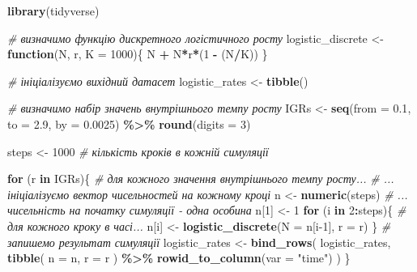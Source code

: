 \documentclass[
  11pt,
]{book}
\newenvironment{Shaded}{\begin{snugshade}}{\end{snugshade}}
\newcommand{\AttributeTok}[1]{\textcolor[rgb]{0.13,0.29,0.53}{#1}}
\newcommand{\CommentTok}[1]{\textcolor[rgb]{0.56,0.35,0.01}{\textit{#1}}}
\newcommand{\ControlFlowTok}[1]{\textcolor[rgb]{0.13,0.29,0.53}{\textbf{#1}}}
\newcommand{\DecValTok}[1]{\textcolor[rgb]{0.00,0.00,0.81}{#1}}
\newcommand{\FloatTok}[1]{\textcolor[rgb]{0.00,0.00,0.81}{#1}}
\newcommand{\FunctionTok}[1]{\textcolor[rgb]{0.13,0.29,0.53}{\textbf{#1}}}
\newcommand{\NormalTok}[1]{#1}
\newcommand{\OtherTok}[1]{\textcolor[rgb]{0.56,0.35,0.01}{#1}}
\newcommand{\SpecialCharTok}[1]{\textcolor[rgb]{0.81,0.36,0.00}{\textbf{#1}}}
\newcommand{\StringTok}[1]{\textcolor[rgb]{0.31,0.60,0.02}{#1}}
\begin{document}
\begin{Shaded}
\begin{Highlighting}[]
\FunctionTok{library}\NormalTok{(tidyverse)}

\CommentTok{\# визначимо функцію дискретного логістичного росту}
\NormalTok{logistic\_discrete }\OtherTok{\textless{}{-}} \ControlFlowTok{function}\NormalTok{(N, r, }\AttributeTok{K =} \DecValTok{1000}\NormalTok{)\{}
\NormalTok{  N }\SpecialCharTok{+}\NormalTok{ N}\SpecialCharTok{*}\NormalTok{r}\SpecialCharTok{*}\NormalTok{(}\DecValTok{1} \SpecialCharTok{{-}}\NormalTok{ (N}\SpecialCharTok{/}\NormalTok{K))}
\NormalTok{\}}

\CommentTok{\# ініціалізуємо вихідний датасет}
\NormalTok{logistic\_rates }\OtherTok{\textless{}{-}} \FunctionTok{tibble}\NormalTok{()}

\CommentTok{\# визначимо набір значень внутрішнього темпу росту}
\NormalTok{IGRs }\OtherTok{\textless{}{-}} \FunctionTok{seq}\NormalTok{(}\AttributeTok{from =} \FloatTok{0.1}\NormalTok{, }\AttributeTok{to =} \FloatTok{2.9}\NormalTok{, }\AttributeTok{by =} \FloatTok{0.0025}\NormalTok{) }\SpecialCharTok{\%\textgreater{}\%} 
  \FunctionTok{round}\NormalTok{(}\AttributeTok{digits =} \DecValTok{3}\NormalTok{)}

\NormalTok{steps }\OtherTok{\textless{}{-}} \DecValTok{1000} \CommentTok{\# кількість кроків в кожній симуляції}

\ControlFlowTok{for}\NormalTok{ (r }\ControlFlowTok{in}\NormalTok{ IGRs)\{ }\CommentTok{\# для кожного значення внутрішнього темпу росту...}
  \CommentTok{\# ... ініціалізуємо вектор чисельностей на кожному кроці}
\NormalTok{  n }\OtherTok{\textless{}{-}} \FunctionTok{numeric}\NormalTok{(steps)}
  \CommentTok{\# ... чисельність на початку симуляції {-} одна особина}
\NormalTok{  n[}\DecValTok{1}\NormalTok{] }\OtherTok{\textless{}{-}} \DecValTok{1}
  \ControlFlowTok{for}\NormalTok{ (i }\ControlFlowTok{in} \DecValTok{2}\SpecialCharTok{:}\NormalTok{steps)\{ }\CommentTok{\# для кожного кроку в часі...}
\NormalTok{    n[i] }\OtherTok{\textless{}{-}} \FunctionTok{logistic\_discrete}\NormalTok{(}\AttributeTok{N =}\NormalTok{ n[i}\DecValTok{{-}1}\NormalTok{], }\AttributeTok{r =}\NormalTok{ r)}
\NormalTok{  \}}
  \CommentTok{\# запишемо результат симуляції}
\NormalTok{  logistic\_rates }\OtherTok{\textless{}{-}} \FunctionTok{bind\_rows}\NormalTok{(}
\NormalTok{    logistic\_rates,}
    \FunctionTok{tibble}\NormalTok{(}
      \AttributeTok{n =}\NormalTok{ n, }
      \AttributeTok{r =}\NormalTok{ r}
\NormalTok{    ) }\SpecialCharTok{\%\textgreater{}\%} \FunctionTok{rowid\_to\_column}\NormalTok{(}\AttributeTok{var =} \StringTok{"time"}\NormalTok{)}
\NormalTok{  )}
\NormalTok{\}}


\end{Highlighting}
\end{Shaded}
\end{document}
